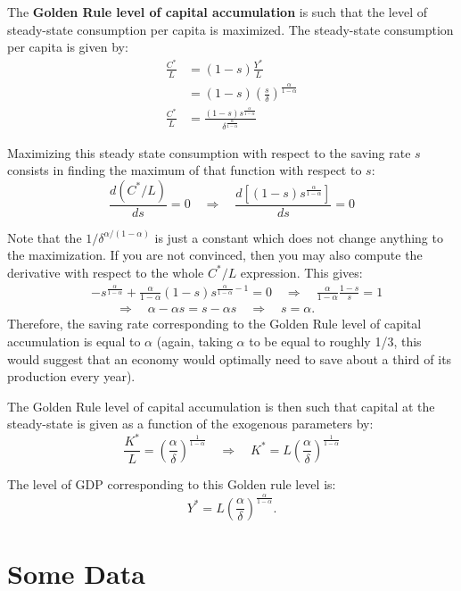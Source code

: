 \documentclass[]{book}
\theoremstyle{definition}
\theoremstyle{definition}
\theoremstyle{definition}
\theoremstyle{remark}
\begin{document}
The \textbf{Golden Rule level of capital accumulation} is such that the
level of steady-state consumption per capita is maximized. The
steady-state consumption per capita is given by: \[
\begin{aligned}
\frac{C^{*}}{L}&=(1-s)\frac{Y^{*}}{L}\\
&=(1-s)\left(\frac{s}{\delta}\right)^{\frac{\alpha}{1-\alpha}}\\
\frac{C^{*}}{L}&=\frac{(1-s)s^{\frac{\alpha}{1-\alpha}}}{\delta^{\frac{\alpha}{1-\alpha}}}
\end{aligned}
\]

Maximizing this steady state consumption with respect to the saving rate
\(s\) consists in finding the maximum of that function with respect to
\(s\):
\[\frac{d\left(C^{*}/L\right)}{ds}=0\quad\Rightarrow\quad\frac{d\left[(1-s)s^{\frac{\alpha}{1-\alpha}}\right]}{ds}=0\]

Note that the \(1/\delta^{\alpha/(1-\alpha)}\) is just a constant which
does not change anything to the maximization. If you are not convinced,
then you may also compute the derivative with respect to the whole
\(C^{*}/L\) expression. This gives: \[
\begin{aligned}
&-s^{\frac{\alpha}{1-\alpha}}+\frac{\alpha}{1-\alpha}(1-s)s^{\frac{\alpha}{1-\alpha}-1} =0 \quad \Rightarrow\quad\frac{\alpha}{1-\alpha}\frac{1-s}{s}=1\\
&\quad \quad \Rightarrow\quad\alpha-\alpha s=s-\alpha s \quad\Rightarrow\quad\boxed{s=\alpha}.
\end{aligned}
\] Therefore, the saving rate corresponding to the Golden Rule level of
capital accumulation is equal to \(\alpha\) (again, taking \(\alpha\) to
be equal to roughly 1/3, this would suggest that an economy would
optimally need to save about a third of its production every year).

The Golden Rule level of capital accumulation is then such that capital
at the steady-state is given as a function of the exogenous parameters
by:
\[\frac{K^{*}}{L}=\left(\frac{\alpha}{\delta}\right)^{\frac{1}{1-\alpha}}\quad\Rightarrow\quad K^{*}=L\left(\frac{\alpha}{\delta}\right)^{\frac{1}{1-\alpha}}\]

The level of GDP corresponding to this Golden rule level is:
\[Y^{*}=L\left(\frac{\alpha}{\delta}\right)^{\frac{\alpha}{1-\alpha}}.\]

\section{Some Data}\label{some-data}
\end{document}
